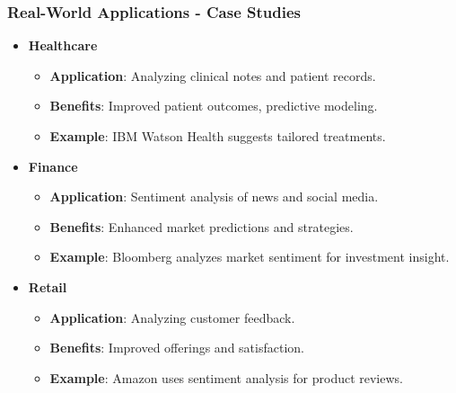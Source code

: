 \documentclass[aspectratio=169]{beamer}
\begin{document}
\begin{frame}[fragile]
    \frametitle{Real-World Applications - Case Studies}
    \begin{itemize}
        \item \textbf{Healthcare}
            \begin{itemize}
                \item \textbf{Application}: Analyzing clinical notes and patient records.
                \item \textbf{Benefits}: Improved patient outcomes, predictive modeling.
                \item \textbf{Example}: IBM Watson Health suggests tailored treatments.
            \end{itemize}
        
        \item \textbf{Finance}
            \begin{itemize}
                \item \textbf{Application}: Sentiment analysis of news and social media.
                \item \textbf{Benefits}: Enhanced market predictions and strategies.
                \item \textbf{Example}: Bloomberg analyzes market sentiment for investment insight.
            \end{itemize}
        
        \item \textbf{Retail}
            \begin{itemize}
                \item \textbf{Application}: Analyzing customer feedback.
                \item \textbf{Benefits}: Improved offerings and satisfaction.
                \item \textbf{Example}: Amazon uses sentiment analysis for product reviews.
            \end{itemize}
    \end{itemize}
\end{frame}
\end{document}
